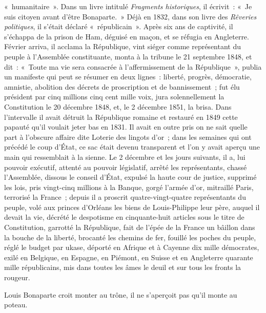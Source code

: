 \documentclass[french,twoside]{book} %
\begin{document}
« humanitaire ». Dans un livre intitulé \emph{Fragments historiques}, il écrivit : « Je suis citoyen avant d’être Bonaparte. » Déjà en 1832, dans son livre des \emph{Rêveries politiques}, il s’était déclaré « républicain ». Après six ans de captivité, il s’échappa de la prison de Ham, déguisé en maçon, et se réfugia en Angleterre. Février arriva, il acclama la République, vint siéger comme représentant du peuple à l’Assemblée constituante, monta à la tribune le 21 septembre 1848, et dit : « Toute ma vie sera consacrée à l’affermissement de la République », publia un manifeste qui peut se résumer en deux lignes : liberté, progrès, démocratie, amnistie, abolition des décrets de proscription et de bannissement ; fut élu président par cinq millions cinq cent mille voix, jura solennellement la Constitution le 20 décembre 1848, et, le 2 décembre 1851, la brisa. Dans l’intervalle il avait détruit la République romaine et restauré en 1849 cette papauté qu’il voulait jeter bas en 1831. Il avait en outre pris on ne sait quelle part à l’obscure affaire dite Loterie des lingots d’or ; dans les semaines qui ont précédé le coup d’État, ce sac était devenu transparent et l’on y avait aperçu une main qui ressemblait à la sienne. Le 2 décembre et les jours suivants, il a, lui pouvoir exécutif, attenté au pouvoir législatif, arrêté les représentants, chassé l’Assemblée, dissous le conseil d’État, expulsé la haute cour de justice, supprimé les lois, pris vingt-cinq millions à la Banque, gorgé l’armée d’or, mitraillé Paris, terrorisé la France ; depuis il a proscrit quatre-vingt-quatre représentants du peuple, volé aux princes d’Orléans les biens de Louis-Philippe leur père, auquel il devait la vie, décrété le despotisme en cinquante-huit articles sous le titre de Constitution, garrotté la République, fait de l’épée de la France un bâillon dans la bouche de la liberté, brocanté les chemins de fer, fouillé les poches du peuple, réglé le budget par ukase, déporté en Afrique et à Cayenne dix mille démocrates, exilé en Belgique, en Espagne, en Piémont, en Suisse et en Angleterre quarante mille républicains, mis dans toutes les âmes le deuil et sur tous les fronts la rougeur.\par
Louis Bonaparte croit monter au trône, il ne s’aperçoit pas qu’il monte au poteau.
\end{document}

